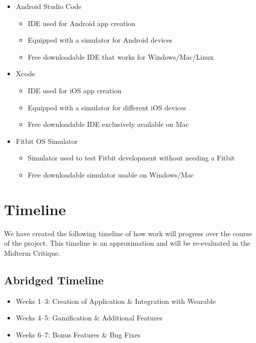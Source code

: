 \documentclass[12pt,letterpaper]{article}
\begin{document}
\begin{itemize}
  \item Android Studio Code
  \begin{itemize}
    \item IDE used for Android app creation
    \item Equipped with a simulator for Android devices
    \item Free downloadable IDE that works for Windows/Mac/Linux
  \end{itemize}
  
  \item Xcode
  \begin{itemize}
    \item IDE used for iOS app creation
    \item Equipped with a simulator for different iOS devices
    \item Free downloadable IDE exclusively available on Mac
  \end{itemize}
  
  \item Fitbit OS Simulator
  \begin{itemize}
    \item Simulator used to test Fitbit development without needing a Fitbit
    \item Free downloadable simulator usable on Windows/Mac
  \end{itemize}
\end{itemize}


\newpage
\section{Timeline}

We have created the following timeline of how work will progress over the course of the project. This timeline is an approximation and will be re-evaluated in the Midterm Critique.

\subsection{Abridged Timeline}

\begin{itemize}
  \item Weeks 1--3: Creation of Application \& Integration with Wearable
  \item Weeks 4--5: Gamification \& Additional Features
  \item Weeks 6--7: Bonus Features \& Bug Fixes
\end{itemize}
\end{document}
